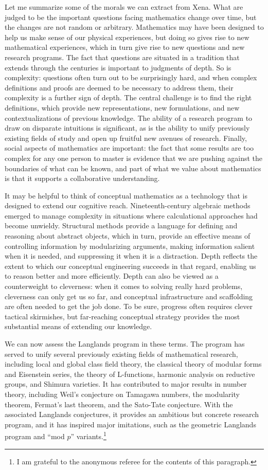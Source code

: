 \documentclass[12pt]{amsart}
\theoremstyle{definition}
\theoremstyle{remark}
\numberwithin{equation}{section}
\begin{document}
Let me summarize some of the morals we can extract from Xena. What are judged to be the important questions facing mathematics change over time, but the changes are not random or arbitrary. Mathematics may have been designed to help us make sense of our physical experiences, but doing so gives rise to new mathematical experiences, which in turn give rise to new questions and new research programs. The fact that questions are situated in a tradition that extends through the centuries is important to judgments of depth. So is complexity: questions often turn out to be surprisingly hard, and when complex definitions and proofs are deemed to be necessary to address them, their complexity is a further sign of depth. The central challenge is to find the right definitions, which provide new representations, new formulations, and new contextualizations of previous knowledge. The ability of a research program to draw on disparate intuitions is significant, as is the ability to unify previously existing fields of study and open up fruitful new avenues of research. Finally, social aspects of mathematics are important: the fact that some results are too complex for any one person to master is evidence that we are pushing against the boundaries of what can be known, and part of what we value about mathematics is that it supports a collaborative understanding.

It may be helpful to think of conceptual mathematics as a technology that is designed to extend our cognitive reach. Nineteenth-century algebraic methods emerged to manage complexity in situations where calculational approaches had become unwieldy. Structural methods provide a language for defining and reasoning about abstract objects, which in turn, provide an effective means of controlling information by modularizing arguments, making information salient when it is needed, and suppressing it when it is a distraction. Depth reflects the extent to which our conceptual engineering succeeds in that regard, enabling us to reason better and more efficiently. Depth can also be viewed as a counterweight to cleverness: when it comes to solving really hard problems, cleverness can only get us so far, and conceptual infrastructure and scaffolding are often needed to get the job done. To be sure, progress often requires clever tactical skirmishes, but far-reaching conceptual strategy provides the most substantial means of extending our knowledge.

We can now assess the Langlands program in these terms. The program has served to unify several previously existing fields of mathematical research, including local and global class field theory, the classical theory of modular forms and Eisenstein series, the theory of L-functions, harmonic analysis on reductive groups, and Shimura varieties. It has contributed to major results in number theory, including Weil's conjecture on Tamagawa numbers, the modularity theorem, Fermat's last theorem, and the Sato-Tate conjecture. With the associated Langlands conjectures, it provides an ambitious but concrete research program, and it has inspired major imitations, such as the geometric Langlands program and ``mod $p$'' variants.\footnote{I am grateful to the anonymous referee for the contents of this paragraph.}
\end{document}
